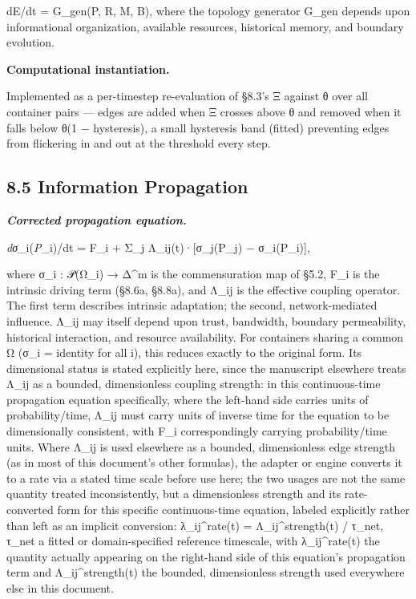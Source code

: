 \documentclass[
]{article}
\begin{document}
dE/dt = G\_gen(P, R, M, B), where the topology generator G\_gen depends
upon informational organization, available resources, historical memory,
and boundary evolution.

\textbf{Computational instantiation.}

Implemented as a per-timestep re-evaluation of §8.3's Ξ against θ over
all container pairs --- edges are added when Ξ crosses above θ and
removed when it falls below θ(1 − hysteresis), a small hysteresis band
(fitted) preventing edges from flickering in and out at the threshold
every step.

\hypertarget{information-propagation}{%
\subsection{8.5 Information Propagation}\label{information-propagation}}

\emph{\textbf{Corrected propagation equation.}}

\emph{dσ}\_i(\emph{P}\_i)/dt = F\_i + Σ\_j Λ\_ij(t)·{[}σ\_j(P\_j) −
σ\_i(P\_i){]},

where σ\_i : 𝒫(Ω\_i) → Δ\^{}m is the commensuration map of §5.2, F\_i is
the intrinsic driving term (§8.6a, §8.8a), and Λ\_ij is the effective
coupling operator. The first term describes intrinsic adaptation; the
second, network-mediated influence. Λ\_ij may itself depend upon trust,
bandwidth, boundary permeability, historical interaction, and resource
availability. For containers sharing a common Ω (σ\_i = identity for all
i), this reduces exactly to the original form. Its dimensional status is
stated explicitly here, since the manuscript elsewhere treats Λ\_ij as a
bounded, dimensionless coupling strength: in this continuous-time
propagation equation specifically, where the left-hand side carries
units of probability/time, Λ\_ij must carry units of inverse time for
the equation to be dimensionally consistent, with F\_i correspondingly
carrying probability/time units. Where Λ\_ij is used elsewhere as a
bounded, dimensionless edge strength (as in most of this document's
other formulas), the adapter or engine converts it to a rate via a
stated time scale before use here; the two usages are not the same
quantity treated inconsistently, but a dimensionless strength and its
rate-converted form for this specific continuous-time equation, labeled
explicitly rather than left as an implicit conversion: λ\_ij\^{}rate(t)
= Λ\_ij\^{}strength(t) / τ\_net, τ\_net a fitted or domain-specified
reference timescale, with λ\_ij\^{}rate(t) the quantity actually
appearing on the right-hand side of this equation's propagation term and
Λ\_ij\^{}strength(t) the bounded, dimensionless strength used everywhere
else in this document.
\end{document}
